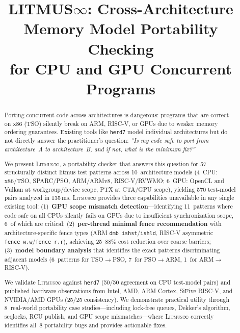 \documentclass[10pt]{article}
\title{\textbf{LITMUS$\infty$: Cross-Architecture Memory Model Portability Checking\\for CPU and GPU Concurrent Programs}}
\date{}
\newcommand{\litmus}{\textsc{Litmus$\infty$}}
\begin{document}
\maketitle

\begin{abstract}
Porting concurrent code across architectures is dangerous: programs that
are correct on x86 (TSO) silently break on ARM, RISC-V, or GPUs due to
weaker memory ordering guarantees. Existing tools like \texttt{herd7} model
individual architectures but do not directly answer the practitioner's
question: \emph{``Is my code safe to port from architecture~A to
architecture~B, and if not, what is the minimum fix?''}

We present \litmus{}, a portability checker that answers this question for
57 structurally distinct litmus test patterns across 10~architecture models
(4~CPU: x86/TSO, SPARC/PSO, ARM/ARMv8, RISC-V/RVWMO; 6~GPU: OpenCL and
Vulkan at workgroup/device scope, PTX at CTA/GPU scope), yielding 570
test-model pairs analyzed in 135\,ms. \litmus{} provides three
capabilities unavailable in any single existing tool:
(1)~\textbf{GPU scope mismatch detection}---identifying 11~patterns where
code safe on all CPUs silently fails on GPUs due to insufficient
synchronization scope, 6~of which are critical;
(2)~\textbf{per-thread minimal fence recommendation} with architecture-specific
fence types (ARM \texttt{dmb~ishst}/\texttt{ishld}, RISC-V asymmetric
\texttt{fence~w,w}/\texttt{fence~r,r}), achieving 25--88\% cost reduction
over coarse barriers;
(3)~\textbf{model boundary analysis} that identifies the exact patterns
discriminating adjacent models (6~patterns for TSO$\to$PSO, 7~for
PSO$\to$ARM, 1~for ARM$\to$RISC-V).

We validate \litmus{} against \texttt{herd7} (50/50 agreement on CPU
test-model pairs) and published hardware observations from Intel, AMD,
ARM Cortex, SiFive RISC-V, and NVIDIA/AMD GPUs (25/25 consistency). We
demonstrate practical utility through 8~real-world portability case
studies---including lock-free queues, Dekker's algorithm, seqlocks, RCU
publish, and GPU scope mismatches---where \litmus{} correctly identifies
all~8 portability bugs and provides actionable fixes.
\end{abstract}

\end{document}
